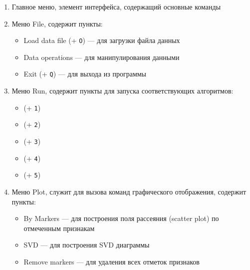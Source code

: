 \documentclass[12pt,tikz]{instruction}
\begin{document}
\begin{enumerate}
	\item Главное меню, элемент интерфейса, содержащий основные команды
	\item Меню File, содержит пункты:
		\begin{itemize}
			\item Load data file (\Ctrl + \texttt{O}) --- для загрузки файла данных
			\item Data operations --- для манипулирования данными
			\item Exit (\Ctrl + \texttt{Q}) --- для выхода из программы
		\end{itemize}
	\item Меню Run, содержит пункты для запуска соответствующих алгоритмов:
		\begin{itemize}
			\item \AWard (\Ctrl + \texttt{1})
			\item \AWardpb (\Ctrl + \texttt{2})
			\item \BiKMR (\Ctrl + \texttt{3})
			\item \dePDDP (\Ctrl + \texttt{4})
			\item \IKmeans (\Ctrl + \texttt{5})
		\end{itemize}
	\item Меню Plot, служит для вызова команд графического отображения, содержит пункты:
	\begin{itemize}
		\item By Markers --- для построения поля рассеяния (scatter plot) по отмеченным признакам
		\item SVD --- для построения SVD диаграммы 			
		\item Remove markers --- для удаления всех отметок признаков
	\end{itemize}
	


\end{enumerate}
\end{document}
